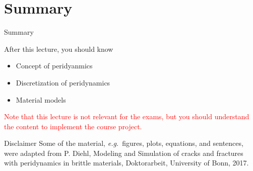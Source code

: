 \documentclass[12pt,t]{beamer}
\begin{document}
\section{Summary}
\begin{frame}{Summary}
\begin{block}{After this lecture, you should know}
\begin{itemize}
\item Concept of peridyanmics
\item Discretization of peridynamics
\item Material models 
\end{itemize}
\end{block}

\begin{center}
\textcolor{red}{Note that this lecture is not relevant for the exams, but you should understand the content to implement the course project.}
\end{center}
\end{frame}



\begin{frame}{Disclaimer}
Some of the material, \emph{e.g.}\ figures, plots, equations, and sentences, were adapted from P. Diehl, Modeling and Simulation of cracks and fractures with peridynamics in brittle materials, Doktorarbeit, University of Bonn, 2017.\\



\end{frame}
\end{document}
